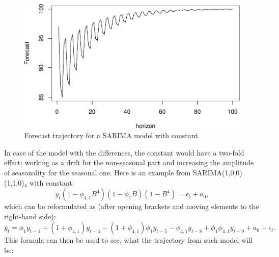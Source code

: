 \documentclass[
]{book}
\theoremstyle{definition}
\theoremstyle{definition}
\theoremstyle{definition}
\theoremstyle{definition}
\theoremstyle{remark}
\begin{document}
\begin{figure}
\centering
\includegraphics{Svetunkov--2022----ADAM_files/figure-latex/SARIMAConstantTrajectory-1.pdf}
\caption{\label{fig:SARIMAConstantTrajectory}Forecast trajectory for a SARIMA model with constant.}
\end{figure}

In case of the model with the differences, the constant would have a two-fold effect: working as a drift for the non-seasonal part and increasing the amplitude of seasonality for the seasonal one. Here is an example from SARIMA(1,0,0)(1,1,0)\(_4\) with constant:
\begin{equation}
  y_t (1 -\phi_{4,1} B^4)(1 -\phi_{1} B) (1 -B^4) = \epsilon_t + a_0 ,
  \label{eq:SARIMA101110Example01}
\end{equation}
which can be reformulated as (after opening brackets and moving elements to the right-hand side):
\begin{equation}
  y_t = \phi_{1} y_{t-1} + (1+\phi_{4,1}) y_{t-4} -(1+\phi_{4,1}) \phi_{1} y_{t-5} -\phi_{4,1} y_{t-8} + \phi_1 \phi_{4,1} y_{t-9} + a_0 + \epsilon_t .
  \label{eq:SARIMA101110Example02}
\end{equation}
This formula can then be used to see, what the trajectory from such model will be:
\end{document}
